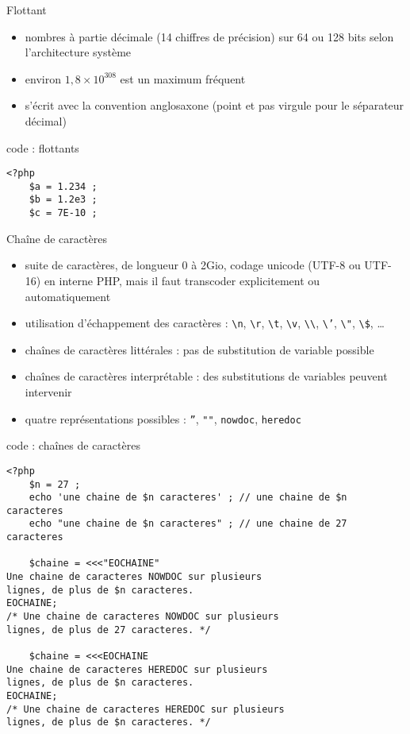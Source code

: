\begin{frame}[containsverbatim]{Flottant}
	\begin{itemize}
		\item nombres à partie décimale (14 chiffres de précision) sur 64 ou 128 bits selon l'architecture système
		\item environ $1,8 \times 10^{308}$ est un maximum fréquent
		\item s'écrit avec la convention anglosaxone (point et pas virgule pour le séparateur décimal)  
	\end{itemize}
	\begin{block}{code : flottants}
		\begin{lstlisting}
<?php
	$a = 1.234 ;
	$b = 1.2e3 ;
	$c = 7E-10 ;
		\end{lstlisting}
	\end{block}
\end{frame}

\begin{frame}[containsverbatim]{Chaîne de caractères}
	\begin{itemize}
		\item suite de caractères, de longueur 0 à 2Gio, codage unicode (UTF-8 ou UTF-16) en interne PHP, mais il faut transcoder explicitement ou automatiquement
		\item utilisation d'échappement des caractères : \texttt{\textbackslash{}n}, \texttt{\textbackslash{}r}, \texttt{\textbackslash{}t}, \texttt{\textbackslash{}v}, \texttt{\textbackslash{}\textbackslash{}}, \texttt{\textbackslash{}'}, \texttt{\textbackslash{}"}, \texttt{\textbackslash{}\$}, \ldots
		\item chaînes de caractères littérales : pas de substitution de variable possible
		\item chaînes de caractères interprétable : des substitutions de variables peuvent intervenir
		\item quatre représentations possibles : \texttt{''}, \texttt{""}, \texttt{nowdoc}, \texttt{heredoc}
	\end{itemize}
	\begin{block}{code : chaînes de caractères}
		\begin{lstlisting}
<?php
	$n = 27 ;
	echo 'une chaine de $n caracteres' ; // une chaine de $n caracteres
	echo "une chaine de $n caracteres" ; // une chaine de 27 caracteres
	
	$chaine = <<<"EOCHAINE"
Une chaine de caracteres NOWDOC sur plusieurs
lignes, de plus de $n caracteres.
EOCHAINE;
/* Une chaine de caracteres NOWDOC sur plusieurs
lignes, de plus de 27 caracteres. */

	$chaine = <<<EOCHAINE
Une chaine de caracteres HEREDOC sur plusieurs
lignes, de plus de $n caracteres.
EOCHAINE;
/* Une chaine de caracteres HEREDOC sur plusieurs
lignes, de plus de $n caracteres. */
		\end{lstlisting}
	\end{block}
\end{frame}


